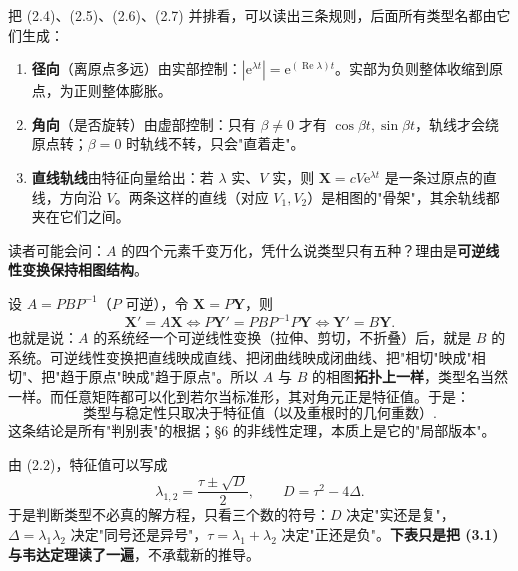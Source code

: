 \documentclass[11pt]{ctexart}
\newcommand{\X}{\mathbf{X}}\newcommand{\Y}{\mathbf{Y}}
\newcommand{\abs}[1]{\left|#1\right|}
\begin{document}

把 (2.4)、(2.5)、(2.6)、(2.7) 并排看，可以读出三条规则，后面所有类型名都由它们生成：

\begin{enumerate}
\item \textbf{径向}（离原点多远）由实部控制：$\abs{\mathrm{e}^{\lambda t}}=\mathrm{e}^{(\operatorname{Re}\lambda)t}$。实部为负则整体收缩到原点，为正则整体膨胀。
\item \textbf{角向}（是否旋转）由虚部控制：只有 $\beta\neq0$ 才有 $\cos\beta t,\sin\beta t$，轨线才会绕原点转；$\beta=0$ 时轨线不转，只会"直着走"。
\item \textbf{直线轨线}由特征向量给出：若 $\lambda$ 实、$V$ 实，则 $\X=cV\mathrm{e}^{\lambda t}$ 是一条过原点的直线，方向沿 $V$。两条这样的直线（对应 $V_1,V_2$）是相图的"骨架"，其余轨线都夹在它们之间。
\end{enumerate}


读者可能会问：$A$ 的四个元素千变万化，凭什么说类型只有五种？理由是\textbf{可逆线性变换保持相图结构}。

设 $A=PBP^{-1}$（$P$ 可逆），令 $\X=P\Y$，则
\[
\X'=A\X\iff P\Y'=PBP^{-1}P\Y\iff \Y'=B\Y .
\]
也就是说：$A$ 的系统经一个可逆线性变换（拉伸、剪切，不折叠）后，就是 $B$ 的系统。可逆线性变换把直线映成直线、把闭曲线映成闭曲线、把"相切"映成"相切"、把"趋于原点"映成"趋于原点"。所以 $A$ 与 $B$ 的相图\textbf{拓扑上一样}，类型名当然一样。而任意矩阵都可以化到若尔当标准形，其对角元正是特征值。于是：
\[
\text{类型与稳定性只取决于特征值（以及重根时的几何重数）}.
\]
这条结论是所有"判别表"的根据；§6 的非线性定理，本质上是它的"局部版本"。



由 (2.2)，特征值可以写成
\[
\lambda_{1,2}=\frac{\tau\pm\sqrt{D}}{2},\qquad D=\tau^{2}-4\Delta .
\tag{3.1}
\]
于是判断类型不必真的解方程，只看三个数的符号：$D$ 决定"实还是复"，$\Delta=\lambda_1\lambda_2$ 决定"同号还是异号"，$\tau=\lambda_1+\lambda_2$ 决定"正还是负"。\textbf{下表只是把 (3.1) 与韦达定理读了一遍}，不承载新的推导。
\end{document}
